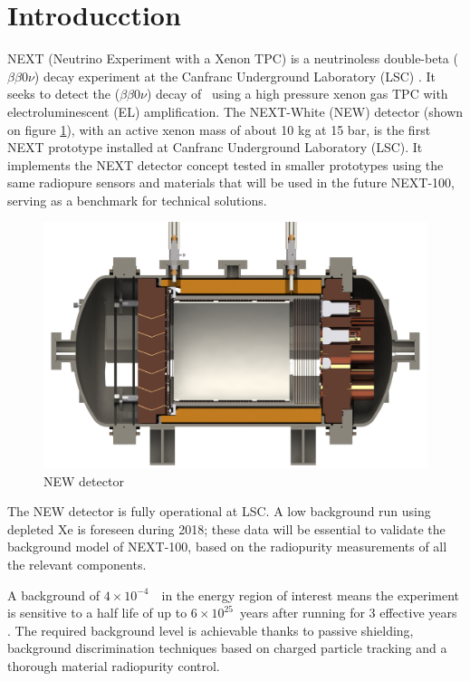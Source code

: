 \documentclass[a4paper, 10pt, oneside, twocolumn, 3p]{elsarticle}
\begin{document}
\linenumbers


\section{Introducction}

\par NEXT (Neutrino Experiment with a Xenon TPC) \cite{1748-0221-7-06-T06001} is a neutrinoless double-beta ($\beta\beta 0\nu$) decay experiment at the Canfranc Underground Laboratory (LSC) \cite{LSC}. It seeks to detect the ($\beta\beta 0\nu$) decay of \XE\ using a high pressure xenon gas TPC with electroluminescent (EL) amplification. The NEXT-White (NEW) detector (shown on figure \ref{fig:NEW}), with an active xenon mass of about 10 kg at 15 bar, is the first NEXT prototype installed at Canfranc Underground Laboratory (LSC). It implements the NEXT detector concept tested in smaller prototypes using the same radiopure sensors and materials that will be used in the future  \mbox{NEXT-100}, serving as a benchmark for technical solutions. 

\begin{figure}
  \begin{center}
   	 \includegraphics[width=.5\textwidth]{./figures/NEW.png}    
   	 \caption{NEW detector}
   	 \label{fig:NEW}
  \end{center}
\end{figure}

\par The NEW detector is fully operational at LSC. A low background run using depleted Xe is foreseen during 2018; these data will be essential to validate the background model of NEXT-100, based on the radiopurity measurements of all the relevant components.

\par A background of ${4\times10^{-4}}$~\ckky\ in the energy region of interest means the experiment is sensitive to a half life of up to ${6\times10^{25}}$~years after running for 3 effective years \cite{1029-8479,1748-0221-8-01-T01002}. The required background level is achievable thanks to passive shielding, background discrimination techniques based on charged particle tracking \cite{1029-8479,1748-0221-12-01-T01004} and a thorough material radiopurity control. 
\end{document}
